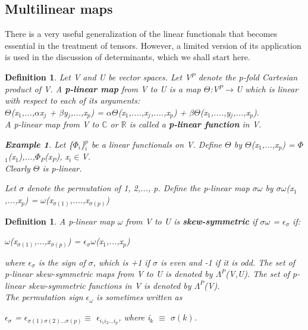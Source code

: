 \documentclass[12pt,a4paper]{article}
\newtheorem{defn}[thm]{Definition}
\newtheorem{exmp}{Example}[section]
\begin{document}
\subsection{Multilinear maps}
There is a very useful generalization of the linear functionals that becomes essential in the treatment of tensors. However, a limited version of its application is used in the discussion of determinants, which we shall start here.

\begin{defn}
Let V and U be vector spaces. Let V$^P$ denote the p-fold Cartesian product of V. A \textbf{p-linear map} from V to U is a map $\Theta$:V$^P$$\to$U which is linear with respect to each of its arguments:\\
$\Theta$(x$_1$,...,$\alpha$x$_j$ + $\beta$y$_j$,...,x$_p$) = $\alpha$$\Theta$(x$_1$,....,x$_j$,....,x$_p$) + $\beta$$\Theta$(x$_1$,....,y$_j$,...,x$_p$).\\
A p-linear map from V to $\mathbb{C}$ or $\mathbb{R}$ is called a \textbf{p-linear function} in V.
\begin{exmp}
Let \{$\Phi$$_i$\}$^{p}_{i}$ be a linear functionals on V. Define $\Theta$ by $\Theta$(x$_1$,...,x$_p$) = $\Phi$$_1$(x$_1$),...,$\Phi$$_P$(x$_P$), x$_i$$\in$V.\\
Clearly $\Theta$ is p-linear.
\end{exmp}
\hspace {1cm} Let $\sigma$ denote the permutation of 1, 2,..., p. Define the p-linear map $\sigma$$\omega$ by $\sigma$$\omega$(x$_1$,...,x$_p$) = $\omega$(x$_{\sigma (1)}$,....,x$_{\sigma (p)}$)\\
\end{defn}
\begin{defn}
A p-linear map $\omega$ from V to U is \textbf{skew-symmetric} if $\sigma\omega$ = $\epsilon_{\sigma}$ if:\begin{center}
$\omega$(x$_{\sigma(1)}$,...,x$_{\sigma(p)}$) = $\epsilon_{\sigma}\omega$(x$_1$,...,x$_p$)\end{center}
where $\epsilon_{\sigma}$ is the sign of $\sigma$, which is +1 if $\sigma$ is even and -1 if it is odd. The set of p-linear skew-symmetric maps from V to U is denoted by $\Lambda^{P}$(V,U). The set of p-linear skew-symmetric functions in V is denoted by $\Lambda^{P}$(V).\\
\hspace{1cm} The permutation sign $\epsilon_{\omega}$ is sometimes written as \begin{center}
$\epsilon_{\sigma}$ = $\epsilon_{\sigma(1)\sigma(2)...\sigma(p)} $$\equiv$ $\epsilon_{i_{1}i_{2}...i_{p}}$, where i$_k$ $\equiv$ $\sigma(k)$.
\end{center}
\end{defn}
\end{document}
